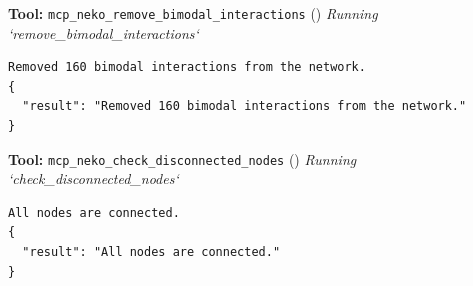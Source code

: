 \documentclass[11pt,a4paper]{article}
\begin{document}
\begin{toolokbox}
\textbf{Tool:} \texttt{mcp\_neko\_remove\_bimodal\_interactions} (\checkmark)
\textit{Running `remove\_bimodal\_interactions`}
\begin{lstlisting}
Removed 160 bimodal interactions from the network.
{
  "result": "Removed 160 bimodal interactions from the network."
}
\end{lstlisting}
\end{toolokbox}
\begin{toolokbox}
\textbf{Tool:} \texttt{mcp\_neko\_check\_disconnected\_nodes} (\checkmark)
\textit{Running `check\_disconnected\_nodes`}
\begin{lstlisting}
All nodes are connected.
{
  "result": "All nodes are connected."
}
\end{lstlisting}
\end{toolokbox}
\end{document}

